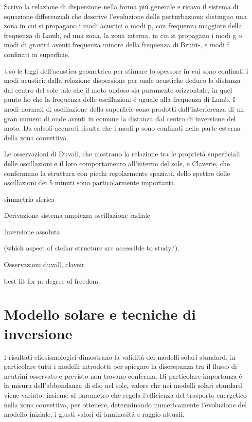 \documentclass[oneside,12pt,fleqn]{memoir}
\begin{document}
Scrivo la relazione di dispersione nella forma pi\'u generale e ricavo il sistema di equazione differenziali che descrive l'evoluzione delle perturbazioni: distinguo una zona in cui si propagano i modi acustici o modi p, con frequenza maggiore della frequenza di Lamb, ed una zona, la zona interna, in cui si propagano i modi g o modi di gravit\'a aventi frequenza minore della frequenza di Brunt-\vai{}, e modi f confinati in superficie. 

Uso le leggi dell'acustica geometrica per stimare lo spessore in cui sono confinati i modi acustici: dalla relazione dispersione per onde acustiche deduco la distanza dal centro del sole tale che il moto ondoso sia puramente orizzontale, in quel punto ho che la frequenza delle oscillazioni \'e uguale alla frequenza di Lamb. I modi normali di oscillazione della superficie sono prodotti dall'interferenza di un gran numero di onde aventi in comune la distanza dal centro di inversione del moto. Da calcoli accurati risulta che i modi p sono confinati nella parte esterna della zona convettiva. 

Le osservazioni di Duvall, che mostrano la relazione tra le propriet\'a superficiali delle oscillazioni e il loro comportamento all'interno del sole, e Claverie, che confermano la struttura con picchi regolarmente spaziati, dello spettro delle oscillazioni dei 5 minuti sono particolarmente importanti.


\begin{itemize*}
\item simmetria sferica
\item Derivazione sistema ampiezza oscillazione radiale

\item Inversione assoluta
\item (which aspect of stellar structure are accessible to study?).
\item Osservazioni duvall, claveir \cite{duv82dispersion}
\item best fit for n: degree of freedom.
\end{itemize*}

\printbibliography[heading=subbibintoc]

\section{Modello solare e tecniche di inversione}


I risultati eliosismologici dimostrano la validit\'a dei modelli solari standard, in particolare tutti i modelli introdotti per spiegare la discrepanza tra il flusso di neutrini osservato e previsto non trovano conferma. Di particolare importanza \'e la  misura  dell'abbondanza di elio nel sole, valore che nei modelli solari standard viene variato, insieme al parametro che regola l'efficienza del trasporto energetico nella zona convettiva, per ottenere, determinando numericamente l'evoluzione del modello iniziale, i giusti valori di luminosit\'a e raggio attuali.
\end{document}
